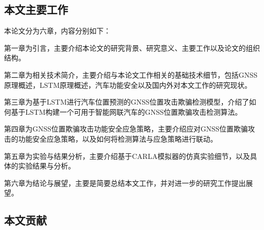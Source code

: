 \subsection{本文主要工作}
本论文分为六章，内容分别如下：

第一章为引言，主要介绍本论文的研究背景、研究意义、主要工作以及论文的组织结构。

第二章为相关技术简介，主要介绍与本论文工作相关的基础技术细节，包括GNSS原理概述，LSTM原理概述，汽车功能安全以及国内外对本文工作的研究现状。

第三章为基于LSTM进行汽车位置预测的GNSS位置攻击欺骗检测模型，介绍了如何基于LSTM构建一个可用于智能网联汽车的GNSS位置欺骗攻击检测算法。

第四章为GNSS位置欺骗攻击功能安全应急策略，主要介绍应对GNSS位置欺骗攻击的功能安全应急策略，以及如何将检测算法与应急策略进行联动。

第五章为实验与结果分析，主要介绍基于CARLA模拟器的仿真实验细节，以及具体的实验结果与分析。

第六章为结论与展望，主要是简要总结本文工作，并对进一步的研究工作提出展望。

\subsection{本文贡献}
